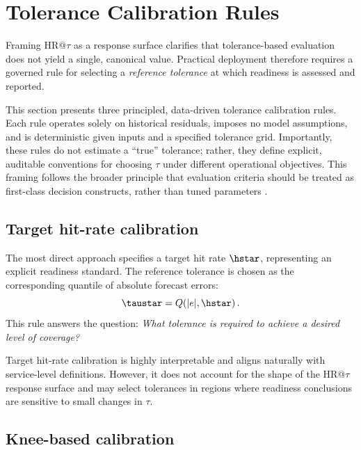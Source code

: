 \section{Tolerance Calibration Rules}
\label{sec:tolerance_calibration}

Framing HR@\(\tau\) as a response surface clarifies that tolerance-based evaluation
does not yield a single, canonical value.
Practical deployment therefore requires a governed rule for selecting a
\emph{reference tolerance} at which readiness is assessed and reported.

This section presents three principled, data-driven tolerance calibration rules.
Each rule operates solely on historical residuals, imposes no model assumptions,
and is deterministic given inputs and a specified tolerance grid.
Importantly, these rules do not estimate a ``true'' tolerance; rather, they define
explicit, auditable conventions for choosing \(\tau\) under different operational
objectives.
This framing follows the broader principle that evaluation criteria should be
treated as first-class decision constructs, rather than tuned parameters
\citep{elkan2001}.

\subsection{Target hit-rate calibration}
\label{subsec:target_hit_rate}

The most direct approach specifies a target hit rate \(\hstar\), representing an
explicit readiness standard.
The reference tolerance is chosen as the corresponding quantile of absolute
forecast errors:
\[
    \taustar = Q\!\left(|e|, \hstar\right).
\]
This rule answers the question:
\emph{What tolerance is required to achieve a desired level of coverage?}

Target hit-rate calibration is highly interpretable and aligns naturally with
service-level definitions.
However, it does not account for the shape of the HR@\(\tau\) response surface and
may select tolerances in regions where readiness conclusions are sensitive to
small changes in \(\tau\).

\subsection{Knee-based calibration}
\label{subsec:knee_calibration}

